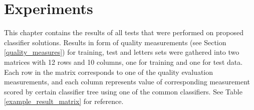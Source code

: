 \chapter{Experiments}
\label{experiments}

This chapter contains the results of all tests that were performed on proposed classifier solutions. Results in form of quality measurements (see Section \ref{quality_measures}) for training, test and letters sets were gathered into two matrices with 12 rows and 10 columns, one for training and one for test data. Each row in the matrix corresponds to one of the quality evaluation measurements, and each column represents value of corresponding measurement scored by certain classifier tree using one of the common classifiers. See Table \ref{example_result_matrix} for reference.

